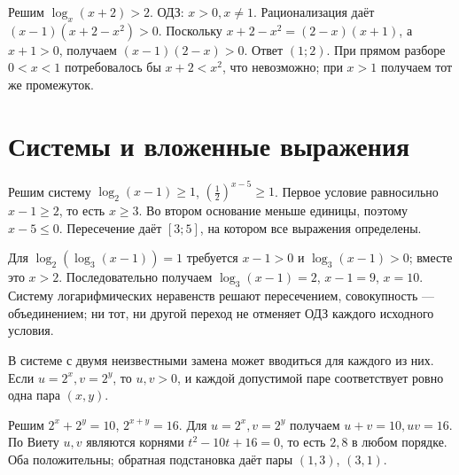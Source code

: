 \ifdim\dimexpr\ht\CatFlowBox+\dp\CatFlowBox\relax<59mm\dp\CatFlowBox=\dimexpr59mm-\ht\CatFlowBox\relax\fi%
\noindent\usebox{\CatFlowBox}\par\addvspace{2pt}
\begin{example}Решим \(\log_x(x+2)>2\). ОДЗ: \(x>0,x\ne1\). Рационализация даёт \((x-1)(x+2-x^2)>0\). Поскольку \(x+2-x^2=(2-x)(x+1)\), а \(x+1>0\), получаем \((x-1)(2-x)>0\). Ответ \((1;2)\). При прямом разборе \(0<x<1\) потребовалось бы \(x+2<x^2\), что невозможно; при \(x>1\) получаем тот же промежуток.\end{example}

\section{Системы и вложенные выражения}
\begin{example}Решим систему \(\log_2(x-1)\geq1\), \((\frac12)^{x-5}\geq1\). Первое условие равносильно \(x-1\geq2\), то есть \(x\geq3\). Во втором основание меньше единицы, поэтому \(x-5\leq0\). Пересечение даёт \([3;5]\), на котором все выражения определены.\end{example}
Для \(\log_2(\log_3(x-1))=1\) требуется \(x-1>0\) и \(\log_3(x-1)>0\); вместе это \(x>2\). Последовательно получаем \(\log_3(x-1)=2\), \(x-1=9\), \(x=10\). Систему логарифмических неравенств решают пересечением, совокупность — объединением; ни тот, ни другой переход не отменяет ОДЗ каждого исходного условия.

В системе с двумя неизвестными замена может вводиться для каждого из них. Если \(u=2^x,v=2^y\), то \(u,v>0\), и каждой допустимой паре соответствует ровно одна пара \((x,y)\).
\begin{example}Решим \(2^x+2^y=10\), \(2^{x+y}=16\). Для \(u=2^x,v=2^y\) получаем \(u+v=10,uv=16\). По Виету \(u,v\) являются корнями \(t^2-10t+16=0\), то есть \(2,8\) в любом порядке. Оба положительны; обратная подстановка даёт пары \((1,3)\), \((3,1)\).\end{example}

\relax

